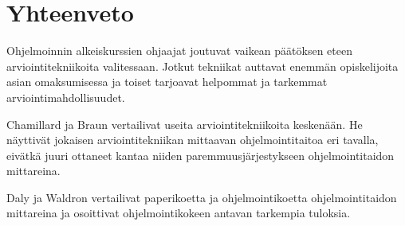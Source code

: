\documentclass[finnish]{../tktltiki2}
\theoremstyle{definition}
\theoremstyle{remark}
\begin{document}
\section{Yhteenveto}

Ohjelmoinnin alkeiskurssien ohjaajat joutuvat vaikean päätöksen eteen arviointitekniikoita valitessaan. Jotkut tekniikat auttavat enemmän opiskelijoita asian omaksumisessa ja toiset tarjoavat helpommat ja tarkemmat arviointimahdollisuudet.

Chamillard ja Braun vertailivat useita arviointitekniikoita keskenään. He näyttivät jokaisen arviointitekniikan mittaavan ohjelmointitaitoa eri tavalla, eivätkä juuri ottaneet kantaa niiden paremmuusjärjestykseen ohjelmointitaidon mittareina.

Daly ja Waldron vertailivat paperikoetta ja ohjelmointikoetta ohjelmointitaidon mittareina ja osoittivat ohjelmointikokeen antavan tarkempia tuloksia.





\end{document}
